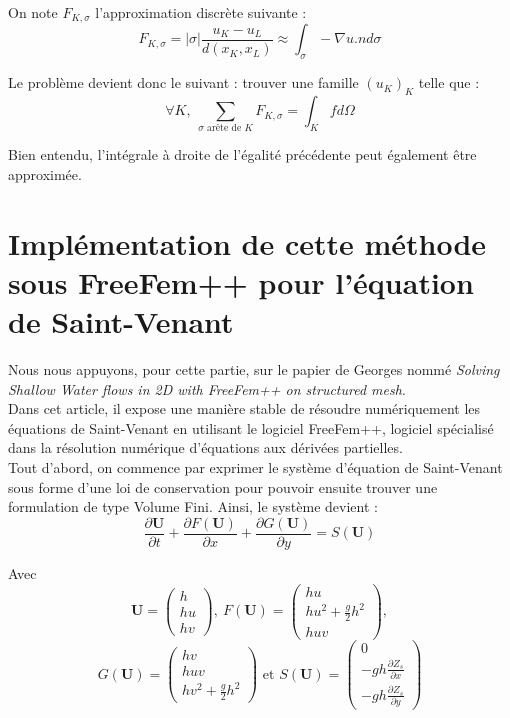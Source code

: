 On note $F_{K,\sigma}$ l'approximation discrète suivante :
\begin{equation} \label{Fksig}
	F_{K,\sigma}=|\sigma|\frac{u_K-u_L}{d(x_K,x_L)}\approx \int_{\sigma} -\nabla u.n d\sigma
\end{equation}

Le problème devient donc le suivant : trouver une famille $(u_K)_K$ telle que :
	\[\forall K,\ \sum_{\sigma \text{ arête de } K} F_{K,\sigma}=\int_K f d\Omega\]

Bien entendu, l'intégrale à droite de l'égalité précédente peut également être approximée. 

\section{Implémentation de cette méthode sous FreeFem++ pour l'équation de Saint-Venant}
Nous nous appuyons, pour cette partie, sur le papier de Georges  nommé \textit{Solving Shallow Water flows in 2D with FreeFem++ on structured mesh}.\\
Dans cet article, il expose une manière stable de résoudre numériquement les équations de Saint-Venant en utilisant le logiciel FreeFem++, logiciel spécialisé dans la résolution numérique d'équations aux dérivées partielles.\\
Tout d'abord, on commence par exprimer le système d'équation de Saint-Venant sous forme d'une loi de conservation pour pouvoir ensuite trouver une formulation de type Volume Fini. Ainsi, le système devient :
\begin{equation} \label{systSVSadaka}
	\frac{\partial \textbf{U}}{\partial t}+\frac{\partial F(\textbf{U})}{\partial x} + \frac{\partial G(\textbf{U})}{\partial y}=S(\textbf{U})
\end{equation}

Avec \[\textbf{U}=\begin{pmatrix} h\\hu\\hv\end{pmatrix},\ F(\textbf{U})=\begin{pmatrix} hu\\ hu^2+\frac{g}{2}h^2\\huv \end{pmatrix},\] \[G(\textbf{U})=\begin{pmatrix} hv\\huv\\hv^2+\frac{g}{2}h^2\end{pmatrix} \text{ et } S(\textbf{U})=\begin{pmatrix} 0\\-gh\frac{\partial Z_s}{\partial x} \\ -gh\frac{\partial Z_s}{\partial y} \end{pmatrix}\]

